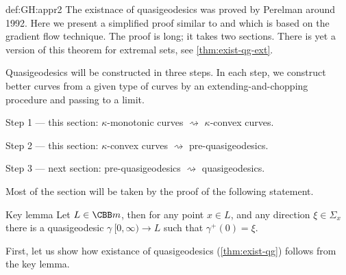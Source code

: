 {\begin{subthm}{def:GH:appr2}
The existnace of quasigeodesics was proved by Perelman around 1992.
Here we present a simplified proof similar to \cite{perelman-petrunin:qg} and \cite{petrunin:survey} which is
based on the gradient flow technique.
The proof is long; it takes two sections.
There is yet a version of this theorem for extremal sets, see \ref{thm:exist-qg-ext}. 


















Quasigeodesics will be constructed in three steps. 
In each step, we construct better curves from a given type of curves
by an extending-and-chopping procedure and passing to a limit.
\begin{description}
\item Step 1 --- this section: $\kappa$-monotonic curves $\rightsquigarrow$ $\kappa$-convex curves.
\item Step 2 --- this section: $\kappa$-convex curves $\rightsquigarrow$ pre-quasigeodesics.
\item Step 3 --- next section: pre-quasigeodesics $\rightsquigarrow$ quasigeodesics.
\end{description}

Most of the section will be taken by the proof of the following statement.











\begin{thm}{Key lemma}\label{lem:big-lem}
Let  $L\in\CBB m{}$, then for any point $x\in L$, and any direction $\xi\in \Sigma_x$
there is a quasigeodesic $\gamma\:[0,\infty)\to L$ such that $\gamma^+(0)=\xi$.
\end{thm}

First, let us show how existance of quasigeodesics (\ref{thm:exist-qg}) follows from the key lemma.


\end{subthm}}
